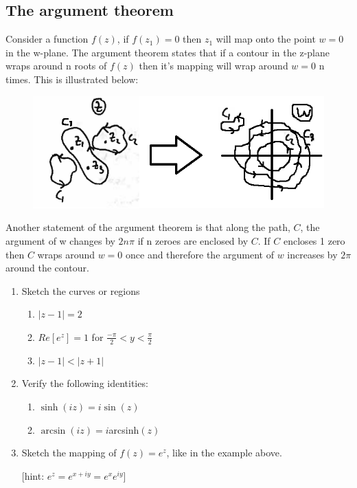 \subsection{The argument theorem}
Consider a function $f(z)$, if $f(z_1)=0$ then $z_1$ will map onto the point $w=0$ in the w-plane.
 The argument theorem states that if a contour in the z-plane wraps around n roots of $f(z)$ then it's mapping will wrap around $w=0$ n times. 
 This is illustrated below:
\begin{figure}[H]
	\centering
	\includegraphics[width=\linewidth]{complex/argthm}
	\captionsetup{font=small} 	
\end{figure}
\noindent Another statement of the argument theorem is that along the path, $C$, the argument of w changes by $2n\pi$ if n zeroes are enclosed by $C$. 
If $C$ encloses 1 zero then $C$ wraps around $w=0$ once and therefore the argument of $w$ increases by $2\pi$ around the contour.
%
\begin{examples}
	\begin{enumerate}
		\item Sketch the curves or regions
		\begin{enumerate}
			\item $|z-1|=2$
			\item $Re[e^z]=1$ for $\frac{-\pi}{2} < y < \frac{\pi}{2}$
			\item $|z-1|<|z+1|$
		\end{enumerate}
		\item Verify the following identities:
		\begin{enumerate}
			\item $\sinh(iz)=i\sin(z)$
			\item $\arcsin(iz)=i$arcsinh$(z)$
		\end{enumerate}
		\item Sketch the mapping of $f(z)=e^z$, like in the example above.
		
		 [hint: $e^z=e^{x+iy}=e^xe^{iy}$]
	\end{enumerate}
\end{examples}
%
%
%
